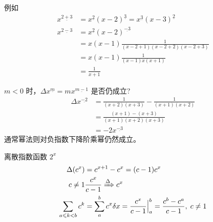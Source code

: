 \documentclass[mode=geye]{elegantnote}
\newcommand{\fallingfactorial}[1]{%
  ^{\underline{#1}}%
}
\begin{document}
例如
\begin{align*}
    x\fallingfactorial{2+3} 
    &= x\fallingfactorial{2}(x-2)\fallingfactorial{3}
    =x\fallingfactorial{3}(x-3)\fallingfactorial{2} \\
    x\fallingfactorial{2-3}
    &= x\fallingfactorial{2}(x-2)\fallingfactorial{-3}\\
    &= x(x-1)\frac{1}{(x-2+1)(x-2+2)(x-2+3)}\\
    &= x(x-1)\frac{1}{(x-1)x(x+1)}\\
    &= \frac{1}{x+1}
\end{align*}

$ m<0 $ 时，$ \Delta x\fallingfactorial{m} = m x\fallingfactorial{m-1} $ 是否仍成立?
\begin{align*}
    \Delta x\fallingfactorial{-2} 
    &= \frac{1}{(x+2)(x+3)} - \frac{1}{(x+1)(x+2)} \\
    &= \frac{(x+1)-(x+3)}{(x+1)(x+2)(x+3)} \\
    &= -2x\fallingfactorial{-3}
\end{align*}
通常幂法则对负指数下降阶乘幂仍然成立。

离散指数函数 $ 2^x $ 
\begin{align*}
    \Delta (c^x) &= c^{x+1}-c^x = (c-1)c^x \\
    c \neq 1 & \frac{c^x}{c-1}\xRightarrow{\Delta}c^x\\
    \sum_{a\leqslant k <b}c^k &= \sum_{a}^{b}c^x \delta x = \frac{c^x}{c-1}\Big|_a^b =\frac{c^b-c^a}{c-1}, \; c\neq 1
\end{align*}
\end{document}
